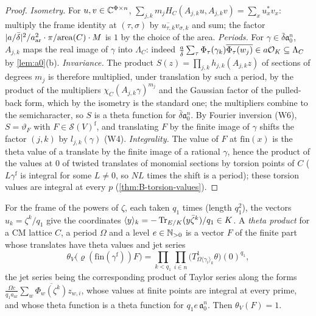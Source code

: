 \begin{proof}
\emph{Isometry.} For $u,v\in\mathbb{C}^{\Phi\times n}$,
$\sum_{j,k}m_jH_C(A_{j,k}u,A_{j,k}v)=\sum_xu_x^*v_x$: multiply the frame identity at $(\tau,\sigma)$ by
$\overline{u_{\tau,k}}v_{\sigma,k}$ and sum; the factor $\lvert a/\bar\delta\rvert^2/a_{\mathrm{ar}}^2\cdot\pi/\mathrm{area}(C)
\cdot M$ is $1$ by the choice of the area. \emph{Periods.} For $\gamma\in\bar\delta\mathfrak a_0^n$,
$A_{j,k}$ maps the real image of $\gamma$ into $\Lambda_C$: indeed
$\frac a{\bar\delta}\sum_\tau\Phi_\tau(\gamma_k)\overline{\Phi_\tau(w_j)}\in a\mathcal{O}_K\subseteq\Lambda_C$ by
\cref{lem:a0}(b). \emph{Invariance.} The product $S(z)=\prod_{j,k}h_{j,k}(A_{j,k}z)$ of sections of
degrees $m_j$ is therefore multiplied, under translation by such a period, by the product of the
multipliers $\chi_C(A_{j,k}\gamma)^{m_j}$ and the Gaussian factor of the pulled-back form, which by the
isometry is the standard one; the multipliers combine to the semicharacter, so $S$ is a theta function
for $\bar\delta\mathfrak a_0^n$. By Fourier inversion (W6), $S=\vartheta_F$ with
$F\in\mathcal S(V)^{\mathrm f}$, and translating $F$ by the finite image of $\gamma$ shifts the factor
$(j,k)$ by $l_{j,k}(\gamma)$ (W4). \emph{Integrality.} The value of $F$ at $\mathrm{fin}(x)$ is the
theta value of a translate by the finite image of a rational $\gamma$, hence the product of the values
at $0$ of twisted translates of monomial sections by torsion points of $C$
($L\gamma^{\mathrm f}$ is integral for some $L\ne0$, so $NL$ times the shift is a period); these torsion
values are integral at every $p$ (\cref{thm:B-torsion-values}).
\end{proof}

For the frame of the powers of $\zeta$, each taken $q_1$ times (length $q_1^2$), the vectors
$u_k=\zeta^k/q_1$ give the coordinates $\langle y\rangle_k=-\operatorname{Tr}_{E/K}(y\bar\zeta^k)/q_1\in K$. A
\emph{theta product} for a CM lattice $C$, a period $\Omega$ and a level $e\in\mathbb{N}_{>0}$ is a vector $F$ of
the finite part whose translates have theta values and jet series
\[
  \theta_V\bigl(\varrho(\mathrm{fin}(\gamma^{\mathrm f}))F\bigr)=\prod_{k<q_1}\prod_{i\in n}
  \bigl(T^1_{\Omega\langle\gamma_i\rangle_k}\theta\bigr)(0)^{q_1},
\]
the jet series being the corresponding product of Taylor series along the forms
$\frac{\Omega c}{q_1a_{\mathrm{ar}}}\sum_w\overline{\Phi_w(\zeta^k)}z_{w,i}$, whose values at finite points
are integral at every prime, and whose theta function is a theta function for $q_1e\,\mathfrak a_0^n$.
Then $\theta_V(F)=1$.

